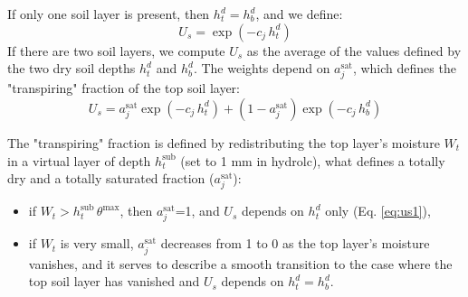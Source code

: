 If only one soil layer is present, then  $h_t^d = h_b^d$, and we define: 
\begin{equation}\label{eq:us1}
U_s=  \exp (-c_j \, h_t^d )
\end{equation}
If there are two soil layers, we compute $U_s$ as the average of the values defined by the two dry soil depths $h_t^d$ and  $h_b^d$. The weights depend on $a_j^\mathrm{sat}$, which defines the "transpiring" fraction of the top soil layer:
\begin{equation}\label{eq:us2}
U_s= a_j^\mathrm{sat} \exp (-c_j \, h_t^d ) + (\mathrm{1}-a_j^\mathrm{sat})  \exp (-c_j \, h_b^d )
\end{equation}

The "transpiring" fraction is defined by redistributing the top layer's moisture $W_t$ in a virtual layer of depth $h_t^\mathrm{sub}$ (set to 1 mm in hydrolc), what defines a totally dry and a totally saturated fraction ($a_j^\mathrm{sat}$):
\begin{itemize}
\item if  $W_t > h_t^\mathrm{sub} \, \theta^\mathrm{max}$, then $a_j^\mathrm{sat}$=1, and $U_s$ depends on $h_t^d$ only (Eq. \ref{eq:us1}), %
\item if $W_t$ is very small, $a_j^\mathrm{sat}$ decreases from 1 to 0 as the top layer's moisture vanishes, and it serves to describe a smooth transition to the case where the top soil layer has vanished and $U_s$ depends on  $h_t^d = h_b^d$.
\end{itemize}

